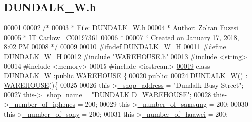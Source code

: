 \hypertarget{_d_u_n_d_a_l_k___w_8h_source}{}\subsection{D\+U\+N\+D\+A\+L\+K\+\_\+\+W.\+h}

\begin{DoxyCode}
00001 
00002 \textcolor{comment}{/* }
00003 \textcolor{comment}{ * File:   DUNDALK\_W.h}
00004 \textcolor{comment}{ * Author: Zoltan Fuzesi}
00005 \textcolor{comment}{ * IT Carlow : C00197361}
00006 \textcolor{comment}{ *}
00007 \textcolor{comment}{ * Created on January 17, 2018, 8:02 PM}
00008 \textcolor{comment}{ */}
00009 
00010 \textcolor{preprocessor}{#ifndef DUNDALK\_W\_H}
00011 \textcolor{preprocessor}{#define DUNDALK\_W\_H}
00012 \textcolor{preprocessor}{#include "\hyperlink{_w_a_r_e_h_o_u_s_e_8h}{WAREHOUSE.h}"}
00013 \textcolor{preprocessor}{#include <string>}
00014 \textcolor{preprocessor}{#include <memory>}
00015 \textcolor{preprocessor}{#include <iostream>}
\hypertarget{_d_u_n_d_a_l_k___w_8h_source.tex_l00019}{}\hyperlink{class_d_u_n_d_a_l_k___w}{00019} \textcolor{keyword}{class }\hyperlink{class_d_u_n_d_a_l_k___w}{DUNDALK\_W} :\textcolor{keyword}{public} \hyperlink{class_w_a_r_e_h_o_u_s_e}{WAREHOUSE} \{
00020 \textcolor{keyword}{public}:
\hypertarget{_d_u_n_d_a_l_k___w_8h_source.tex_l00024}{}\hyperlink{class_d_u_n_d_a_l_k___w_ad459a77b4f3e0aaebb3d178eb014a77f_ad459a77b4f3e0aaebb3d178eb014a77f}{00024}     \hyperlink{class_d_u_n_d_a_l_k___w_ad459a77b4f3e0aaebb3d178eb014a77f_ad459a77b4f3e0aaebb3d178eb014a77f}{DUNDALK\_W}() : \hyperlink{class_w_a_r_e_h_o_u_s_e}{WAREHOUSE}()\{
00025         
00026         this->\hyperlink{class_d_u_n_d_a_l_k___w_a84ef96f22ec520afc66bb26b0d264475_a84ef96f22ec520afc66bb26b0d264475}{\_shop\_address} = \textcolor{stringliteral}{"Dundalk Busy Street"};
00027         this->\hyperlink{class_d_u_n_d_a_l_k___w_ac9018980d31ba581cd83b07df0b171e2_ac9018980d31ba581cd83b07df0b171e2}{\_shop\_name} = \textcolor{stringliteral}{"DUNDALK D\_WAREHOUSE"};
00028         this->\hyperlink{class_d_u_n_d_a_l_k___w_a82b528f661644166d93a5209524b4543_a82b528f661644166d93a5209524b4543}{\_number\_of\_iphones} = 200;
00029         this->\hyperlink{class_d_u_n_d_a_l_k___w_afec98ddc022c03aaaaa2848e5ca7cfb3_afec98ddc022c03aaaaa2848e5ca7cfb3}{\_number\_of\_samsung} = 200;
00030         this->\hyperlink{class_d_u_n_d_a_l_k___w_a9a40b513a6d4153a9a0f37ce47429369_a9a40b513a6d4153a9a0f37ce47429369}{\_number\_of\_sony} = 200;
00031         this->\hyperlink{class_d_u_n_d_a_l_k___w_a84781068676dee44cb4654706d8fec51_a84781068676dee44cb4654706d8fec51}{\_number\_of\_huawei} = 200;

\end{DoxyCode}
